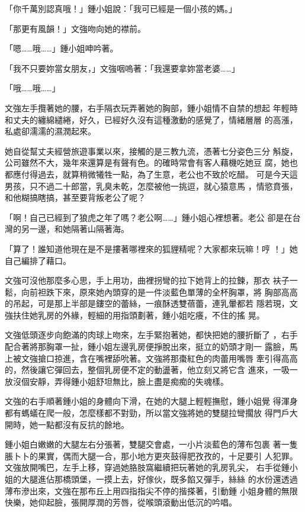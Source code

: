 「你千萬別認真哦！」鍾小姐說：「我可已經是一個小孩的媽。」

「那更有風韻！」文強吻向她的襟前。

「嗯……哦……」鍾小姐呻吟著。

「我不只要妳當女朋友，」文強咽嗚著：「我還要拿妳當老婆……」

「哦……哦……」

文強左手攬著她的腰，右手隔衣玩弄著她的胸部，鍾小姐情不自禁的想起
年輕時和丈夫的纏綿繾綣，好久，已經好久沒有這種激動的感覺了，情緒層層
的高漲，私處卻濡濡的濕潤起來。

她自從幫丈夫經營旅遊事業以來，接觸的是三教九流，憑著七分姿色三分
斛旋，公司雖然不大，幾年來還算是有聲有色。的確時常會有客人藉機吃她豆
腐，她也都應付得過去，就算稍微犧牲一點，為了生意，老公也不致於吃醋。
可是今天這男孩，只不過二十郎當，乳臭未乾，怎麼被他一挑逗，就心猿意馬
，情慾賁張，和他糊搞瞎搞，甚至要背叛老公了呢？

「啊！自己已經到了狼虎之年了嗎？老公啊……」鍾小姐心裡想著。老公
卻是在台灣的另一邊，和她隔著山隔著海。

「算了！誰知道他現在是不是摟著哪裡來的狐貍精呢？大家都來玩嘛！哼
！」她自己編排了藉口。

文強可沒他那麼多心思，手上用功，曲裡拐彎的拉下她背上的拉鍊，那衣
衭子一鬆，向前袒跌下來，原來她內頭穿的是一件淡藍色單薄的全杯胸罩，將
胸部高高的吊起，可是那上半部是鏤空的蕾絲，一痕酥透雙蓓蕾，連乳暈都若
隱若現，文強扶住她乳房的外緣，輕細的用指頭劃著，鍾小姐吃癢，不住的搖
晃。

文強低頭逐步向飽滿的肉球上吻來，左手緊抱著她，都快把她的腰折斷了
，右手配合著將那胸罩一扯，鍾小姐左邊乳房便掙脫出來，挺立的奶頭才剛一
露臉，馬上被文強搶口掠進，含在嘴裡舔吮著。文強將那棗紅色的肉蕾用嘴唇
牽引得高高的，然後讓它彈回去，整個乳房便不定的動盪著，他立刻又將它含
進來，一吸一放沒個安靜，弄得鍾小姐舒坦無比，臉上盡是痴痴的失魂樣。

文強的右手順著鍾小姐的身體向下滑，在她的大腿上輕輕撫慰，鍾小姐覺
得渾身都有螞蟻在爬一般，怎麼樣都不對勁，所以當文強將她的雙腿拉彎擱放
得門戶大開時，她一點都沒有反抗的餘地。

鍾小姐白嫩嫩的大腿左右分張著，雙腿交會處，一小片淡藍色的薄布包裹
著一隻脹卜卜的果實，偶而大腿一合，那小地方更夾鼓得肥孜孜的，十足要引
人犯罪。文強放開嘴巴，左手上移，穿過她胳肢窩繼續把玩著她的乳房乳尖，
右手從鍾小姐的大腿進佔那橋頭堡，一摸上去，好傢伙，既多餡又彈手，絲絲
的水份還透過薄布滲出來，文強在那布丘上用四指指尖不停的揩搽著，引動鍾
小姐身體的無限快樂，她仰起臉，張開厚潤的芳唇，從喉頭滾動出低沉的吟唱。

